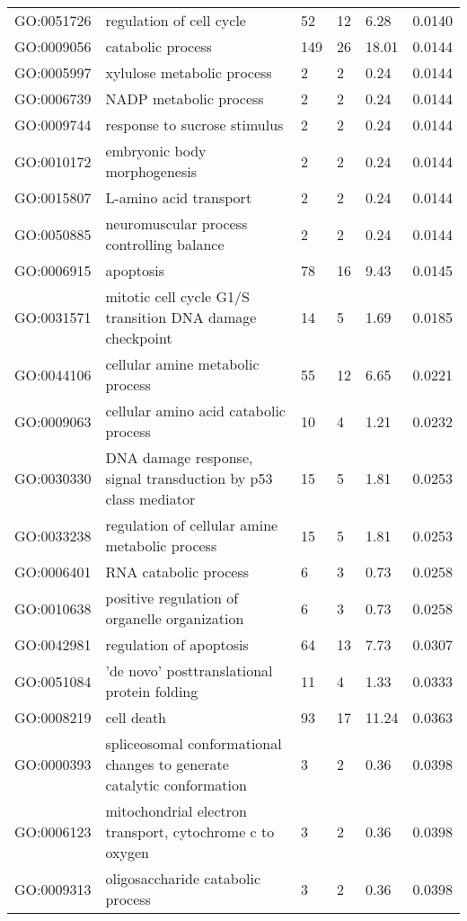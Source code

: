 \documentclass[10pt]{bmc_article}
\newenvironment{bmcformat}{\begin{raggedright}\baselineskip20pt\sloppy\setboolean{publ}{false}}{\end{raggedright}\baselineskip20pt\sloppy}
\begin{document}
\begin{bmcformat}
\begin{longtable}{lp{4.5cm}llll}
  GO:0051726 & regulation of cell cycle &  52 &  12 & 6.28 & 0.0140 \\ 
  GO:0009056 & catabolic process & 149 &  26 & 18.01 & 0.0144 \\ 
  GO:0005997 & xylulose metabolic process &   2 &   2 & 0.24 & 0.0144 \\ 
  GO:0006739 & NADP metabolic process &   2 &   2 & 0.24 & 0.0144 \\ 
  GO:0009744 & response to sucrose stimulus &   2 &   2 & 0.24 & 0.0144 \\ 
  GO:0010172 & embryonic body morphogenesis &   2 &   2 & 0.24 & 0.0144 \\ 
  GO:0015807 & L-amino acid transport &   2 &   2 & 0.24 & 0.0144 \\ 
  GO:0050885 & neuromuscular process controlling balance &   2 &   2 & 0.24 & 0.0144 \\ 
  GO:0006915 & apoptosis &  78 &  16 & 9.43 & 0.0145 \\ 
  GO:0031571 & mitotic cell cycle G1/S transition DNA damage checkpoint &  14 &   5 & 1.69 & 0.0185 \\ 
  GO:0044106 & cellular amine metabolic process &  55 &  12 & 6.65 & 0.0221 \\ 
  GO:0009063 & cellular amino acid catabolic process &  10 &   4 & 1.21 & 0.0232 \\ 
  GO:0030330 & DNA damage response, signal transduction by p53 class mediator &  15 &   5 & 1.81 & 0.0253 \\ 
  GO:0033238 & regulation of cellular amine metabolic process &  15 &   5 & 1.81 & 0.0253 \\ 
  GO:0006401 & RNA catabolic process &   6 &   3 & 0.73 & 0.0258 \\ 
  GO:0010638 & positive regulation of organelle organization &   6 &   3 & 0.73 & 0.0258 \\ 
  GO:0042981 & regulation of apoptosis &  64 &  13 & 7.73 & 0.0307 \\ 
  GO:0051084 & 'de novo' posttranslational protein folding &  11 &   4 & 1.33 & 0.0333 \\ 
  GO:0008219 & cell death &  93 &  17 & 11.24 & 0.0363 \\ 
  GO:0000393 & spliceosomal conformational changes to generate catalytic conformation &   3 &   2 & 0.36 & 0.0398 \\ 
  GO:0006123 & mitochondrial electron transport, cytochrome c to oxygen &   3 &   2 & 0.36 & 0.0398 \\ 
  GO:0009313 & oligosaccharide catabolic process &   3 &   2 & 0.36 & 0.0398 \\ 

\end{longtable}
\end{bmcformat}
\end{document}
